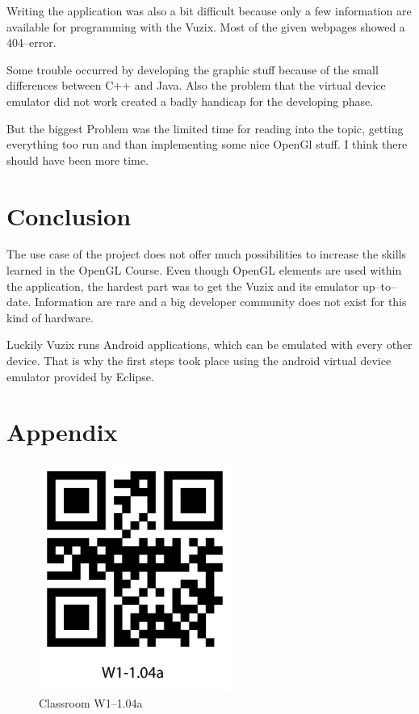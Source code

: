 \documentclass[11pt]{scrartcl}
\begin{document}
\begin{multicols}{2}
			Writing the application was also a bit difficult because only a few information are available for programming with the Vuzix. Most of the given webpages showed a 404--error.
			 
			 Some trouble occurred by developing the graphic stuff because of the small differences between C++ and Java. Also the problem that the virtual device emulator did not work created a badly handicap for the developing phase.
			 
			 But the biggest Problem was the limited time for reading into the topic, getting everything too run and than implementing some nice OpenGl stuff. I think there should have been more time.
			
	\section{Conclusion}
		The use case of the project does not offer much possibilities to increase the skills learned in the OpenGL Course. Even though OpenGL elements are used within the application, the hardest part was to get the Vuzix and its emulator up--to--date. Information are rare and a big developer community does not exist for this kind of hardware.
		
		Luckily Vuzix runs Android applications, which can be emulated with every other device. That is why the first steps took place using the android virtual device emulator provided by Eclipse.
\end{multicols}




\section*{Appendix}
	\begin{figure}[htpb]
		\centering
		\includegraphics[height=7.5cm]{figure/qrcode_W1-104a}
		\caption{Classroom W1--1.04a\label{qrCodeW1-1.04a}}
	\end{figure}
	
\end{document}
